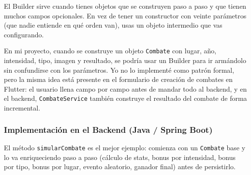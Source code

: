 \documentclass{article}
\begin{document}
El Builder sirve cuando tienes objetos que se construyen paso a paso y
que tienen muchos campos opcionales. En vez de tener un constructor con
veinte par\'ametros (que nadie entiende en qu\'e orden van), usas un objeto
intermedio que vas configurando.
 
En mi proyecto, cuando se construye un objeto \texttt{Combate} con lugar,
a\~no, intensidad, tipo, imagen y resultado, se podr\'ia usar un Builder para
ir arm\'andolo sin confundirse con los par\'ametros. Yo no lo implement\'e como
patr\'on formal, pero la misma idea est\'a presente en el formulario de
creaci\'on de combates en Flutter: el usuario llena campo por campo antes de
mandar todo al backend, y en el backend, \texttt{CombateService} tambi\'en
construye el resultado del combate de forma incremental.
 
\subsubsection*{Implementaci\'on en el Backend (Java / Spring Boot)}
 
El m\'etodo \texttt{simularCombate} es el mejor ejemplo: comienza con un
\texttt{Combate} base y lo va enriqueciendo paso a paso (c\'alculo de stats,
bonus por intensidad, bonus por tipo, bonus por lugar, evento aleatorio,
ganador final) antes de persistirlo.
 
\end{document}
